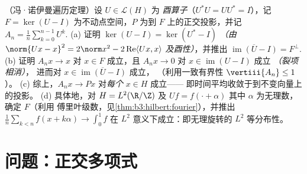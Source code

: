 \begin{exercise}[$\star\star\star$]\label{exo:b3:hilbert:12}
（冯·诺伊曼遍历定理）设 $U \in \mathcal L(H)$ 为
\emph{酉算子}（$U^*U = UU^* = I$），记 $F = \ker(U - I)$
为不动点空间，$P$ 为到 $F$ 上的正交投影，并记
$A_n = \frac1n\sum_{k=0}^{n-1}U^k$.
(a) 证明 $\ker(U - I) = \ker(U^* - I)$ \emph{（由
$\norm{Ux - x}^2 = 2\norm x^2 - 2\operatorname{Re}\langle
Ux, x\rangle$ 及酉性）}，并推出
$\overline{\operatorname{im}(U - I)} = F^\perp$.
(b) 证明 $A_nx \to x$ 对 $x \in F$ 成立，且 $A_nx \to 0$
对 $x \in \operatorname{im}(U - I)$ 成立 \emph{（裂项相消）}，
进而对 $x \in \overline{\operatorname{im}(U - I)}$ 成立，
（利用一致有界性 $\vertiii{A_n} \leq 1$）。
(c) 综上，$A_nx \to Px$ 对\emph{每个} $x \in H$ 成立——
即时间平均收敛于到不变向量上的投影。
(d) 具体地，对 $H = L^2(\R/\Z)$ 及 $Uf = f(\cdot +
\alpha)$ 其中 $\alpha$ 为无理数，确定 $F$（利用
傅里叶级数，见\cref{thm:b3:hilbert:fourier}），并推出
$\frac1n\sum_{k<n}f(x + k\alpha) \to \int_0^1f$ 在
$L^2$ 意义下成立：即无理旋转的 $L^2$ 等分布性。
\end{exercise}

\section{问题：正交多项式}

